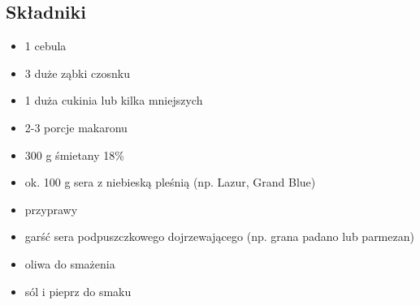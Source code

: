 \documentclass[a4paper,10pt]{book}
\begin{document}
\begin{multicols}{2}

\subsection*{Składniki}
\begin{itemize}
    \item 1 cebula
    \item 3 duże ząbki czosnku
    \item 1 duża cukinia lub kilka mniejszych
    \item 2-3 porcje makaronu 
    \item 300 g śmietany 18\% 
    \item ok. 100 g sera z niebieską pleśnią (np. Lazur, Grand Blue)
    \item przyprawy
    \item garść sera podpuszczkowego dojrzewającego (np. grana padano lub parmezan)
    \item oliwa do smażenia
    \item sól i pieprz do smaku
\end{itemize}

\columnbreak

\begin{figure}[H]
    \centering
\end{figure}
\end{multicols}

\vspace{0.5cm} 
\end{document}
